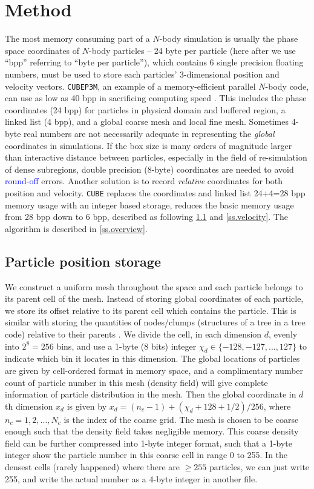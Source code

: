 \documentclass[10pt,twocolumn,preprint]{emulateapj}
\newcommand{\tcb}{\textcolor{blue}}
\begin{document}
\section{Method}\label{s.method}
The most memory consuming part of a $N$-body simulation is usually the phase space coordinates of $N$-body particles -- 24 byte per particle (here after we use ``bpp'' referring to ``byte per particle''), which contains 6 single precision floating numbers, must be used to store each particles' 3-dimensional position and velocity vectors. {\tt CUBEP3M}, an example of a memory-efficient parallel $N$-body code, can use as low as 40 bpp in sacrificing computing speed \citep{2013MNRAS.436..540H}. This includes the phase coordinates (24 bpp) for particles in physical domain and buffered region, a linked list (4 bpp), and a global coarse mesh and local fine mesh. Sometimes 4-byte real numbers are not necessarily adequate in representing the {\it global} coordinates in simulations. If the box size is many orders of magnitude larger than interactive distance between particles, especially in the field of re-simulation of dense subregions, double precision (8-byte) coordinates are needed to avoid \tcb{round-off} errors. Another solution is to record {\it relative} coordinates for both position and velocity. {\tt CUBE} replaces the coordinates and linked list 24+4=28 bpp memory usage with an integer based storage, reduces the basic memory usage from 28 bpp down to 6 bpp, described as following \ref{ss.position} and \ref{ss.velocity}. The algorithm is described in \ref{ss.overview}.

\subsection{Particle position storage}\label{ss.position}
We construct a uniform mesh throughout the space and each particle belongs to its parent cell of the mesh. Instead of storing global coordinates of each particle, we store its offset relative to its parent cell which contains the particle. This is similar with storing the quantities of nodes/clumps (structures of a tree in a tree code) relative to their parents \citep{1985SJSSC...6...85A}. We divide the cell, in each dimension $d$, evenly into $2^8=256$ bins, and use a 1-byte (8 bits) integer $\chi_d \in \{-128,-127,...,127\}$ to indicate which bin it locates in this dimension. The global locations of particles are given by cell-ordered format in memory space, and a complimentary number count of particle number in this mesh (density field) will give complete information of particle distribution in the mesh. Then the global coordinate in $d$th dimension $x_d$ is given by $x_d=(n_c-1)+(\chi_d+128+1/2)/256$, where $n_c=1,2,...,N_c$ is the index of the coarse grid. The mesh is chosen to be coarse enough such that the density field takes negligible memory. This coarse density field can be further compressed into 1-byte integer format, such that a 1-byte integer show the particle number in this coarse cell in range 0 to 255. In the densest cells (rarely happened) where there are $\ge 255$ particles, we can just write 255, and write the actual number as a 4-byte integer in another file.
\end{document}
